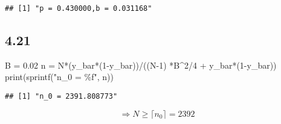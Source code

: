 \documentclass[
]{article}
\newenvironment{Shaded}{\begin{snugshade}}{\end{snugshade}}
\newcommand{\DecValTok}[1]{\textcolor[rgb]{0.00,0.00,0.81}{#1}}
\newcommand{\FloatTok}[1]{\textcolor[rgb]{0.00,0.00,0.81}{#1}}
\newcommand{\FunctionTok}[1]{\textcolor[rgb]{0.00,0.00,0.00}{#1}}
\newcommand{\NormalTok}[1]{#1}
\newcommand{\OtherTok}[1]{\textcolor[rgb]{0.56,0.35,0.01}{#1}}
\newcommand{\SpecialCharTok}[1]{\textcolor[rgb]{0.00,0.00,0.00}{#1}}
\newcommand{\StringTok}[1]{\textcolor[rgb]{0.31,0.60,0.02}{#1}}
\begin{document}
\begin{verbatim}
## [1] "p = 0.430000,b = 0.031168"
\end{verbatim}

\hypertarget{section-9}{%
\subsection{4.21}\label{section-9}}

\begin{Shaded}
\begin{Highlighting}[]
\NormalTok{B }\OtherTok{=} \FloatTok{0.02}
\NormalTok{n }\OtherTok{=}\NormalTok{ N}\SpecialCharTok{*}\NormalTok{(y\_bar}\SpecialCharTok{*}\NormalTok{(}\DecValTok{1}\SpecialCharTok{{-}}\NormalTok{y\_bar))}\SpecialCharTok{/}\NormalTok{((N}\DecValTok{{-}1}\NormalTok{) }\SpecialCharTok{*}\NormalTok{B}\SpecialCharTok{\^{}}\DecValTok{2}\SpecialCharTok{/}\DecValTok{4} \SpecialCharTok{+}\NormalTok{ y\_bar}\SpecialCharTok{*}\NormalTok{(}\DecValTok{1}\SpecialCharTok{{-}}\NormalTok{y\_bar))}
\FunctionTok{print}\NormalTok{(}\FunctionTok{sprintf}\NormalTok{(}\StringTok{"n\_0 = \%f"}\NormalTok{, n))}
\end{Highlighting}
\end{Shaded}

\begin{verbatim}
## [1] "n_0 = 2391.808773"
\end{verbatim}

\[
\Rightarrow N \ge \lceil n_0 \rceil = 2392
\]
\end{document}
